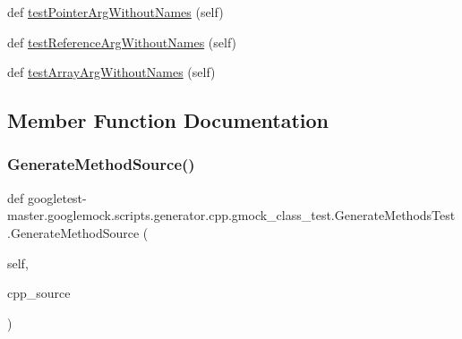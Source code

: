 \begin{DoxyCompactItemize}
\item 
def \mbox{\hyperlink{classgoogletest-master_1_1googlemock_1_1scripts_1_1generator_1_1cpp_1_1gmock__class__test_1_1_generate_methods_test_aa7793e9b0559e378a86ec71dfa2d92ae}{test\+Pointer\+Arg\+Without\+Names}} (self)
\item 
def \mbox{\hyperlink{classgoogletest-master_1_1googlemock_1_1scripts_1_1generator_1_1cpp_1_1gmock__class__test_1_1_generate_methods_test_ae4e6b6093f073b536ef06fac5c46e3a5}{test\+Reference\+Arg\+Without\+Names}} (self)
\item 
def \mbox{\hyperlink{classgoogletest-master_1_1googlemock_1_1scripts_1_1generator_1_1cpp_1_1gmock__class__test_1_1_generate_methods_test_aa939068452086df39c1bfecace62d957}{test\+Array\+Arg\+Without\+Names}} (self)
\end{DoxyCompactItemize}


\subsection{Member Function Documentation}
\mbox{\label{classgoogletest-master_1_1googlemock_1_1scripts_1_1generator_1_1cpp_1_1gmock__class__test_1_1_generate_methods_test_a4ce3cb282700e6169589a278bf879c74}} 
\subsubsection{\texorpdfstring{GenerateMethodSource()}{GenerateMethodSource()}}
{\footnotesize\ttfamily def googletest-\/master.\+googlemock.\+scripts.\+generator.\+cpp.\+gmock\+\_\+class\+\_\+test.\+Generate\+Methods\+Test.\+Generate\+Method\+Source (\begin{DoxyParamCaption}\item[{}]{self,  }\item[{}]{cpp\+\_\+source }\end{DoxyParamCaption})}


